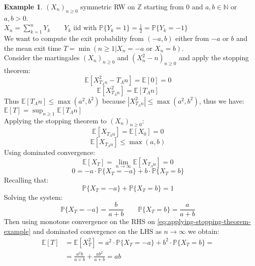 \documentclass[10pt,a4paper]{article}
\theoremstyle{definition}
\newtheorem{exi}{Example}[section]
\begin{document}
\begin{exi}
	$(X_n)_{n\geq0}$ symmetric RW on $\mathbb{Z}$ starting from $0$ and $a,b\in\mathbb{N}$ or $a,b>0$.\\
	$X_n=\sum_{k=1}^{n}Y_k \qquad Y_k$ iid with $\mathbb{P}\{Y_k=1\}=\frac{1}{2}=\mathbb{P}\{Y_k=-1\}$ \\
	We want to compute the exit probability from $(-a,b)$ either from $-a$ or $b$ and the mean exit time $T=\min{(n\geq1|X_n=-a \text{ or } X_n=b)}$. \\
	Consider the martingales $(X_n)_{n\geq0}$ and $(X^2_n-n)_{n\geq0}$ and apply the stopping theorem: 
	\begin{equation*}
		\mathbb{E}[X^2_{T_{\Lambda}n}-T_{\Lambda}n]=\mathbb{E}[0]=0
	\end{equation*}
	\begin{equation}
		\mathbb{E}[X^2_{T_{\Lambda}n}]=\mathbb{E}[T_{\Lambda}n]
		\label{eq:applying-stopping-theorem-example}
	\end{equation}
Thus $ \mathbb{E}[T_{\Lambda}n]\leq\max{(a^2,b^2)} $ because $  |X^2_{T_{\Lambda}n}|\leq\max{(a^2,b^2)}$, thus we have: $\mathbb{E}[T]=\sup_{n\geq1}\mathbb{E}[T_{\Lambda}n]$\\
	Applying the stopping theorem to $(X_n)_{n\geq0}$:
	\begin{equation*}
		\mathbb{E}[X_{T_{\Lambda}n}]=\mathbb{E}[X_0]=0
	\end{equation*}
\begin{equation*}
	\mathbb{E}[X_{T_{\Lambda}n}]\leq\max{(a,b)}
\end{equation*}                                                 
Using dominated convergence:                                    
\begin{equation*}                                               
	\mathbb{E}[X_{T}]=\lim_{n\to\infty}\mathbb{E}[X_{T_{\Lambda}n}]=0
\end{equation*}
\begin{equation*}                                               
	0=-a\cdot\mathbb{P}\{X_T=-a\}+b\cdot\mathbb{P}\{X_T=b\}
\end{equation*}
Recalling that:
\begin{equation*}                                               
	\mathbb{P}\{X_T=-a\}+\mathbb{P}\{X_T=b\}=1
\end{equation*}
Solving the system:
\begin{equation*}                                               
	\mathbb{P}\{X_T=-a\}=\frac{b}{a+b} \qquad \mathbb{P}\{X_T=b\}=\frac{a}{a+b}
\end{equation*}
Then using monotone convergence on the RHS on \eqref{eq:applying-stopping-theorem-example} and dominated convergence on the LHS as $n\to\infty$ we obtain:
\begin{equation*}  
	\begin{split}
		\mathbb{E}[T]&=\mathbb{E}[X^2_T]=a^2\cdot\mathbb{P}\{X_T=-a\}+b^2\cdot\mathbb{P}\{X_T=b\}=\\&=\frac{a^2b}{a+b}+\frac{ab^2}{a+b}=ab
	\end{split}                                             
\end{equation*}
\end{exi}
\end{document}
